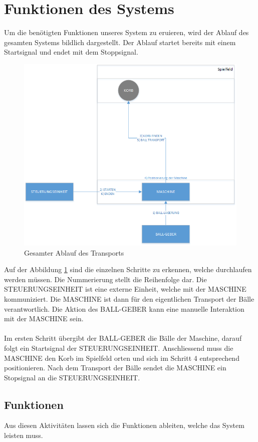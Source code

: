 \section{Funktionen des Systems}
Um die benötigten Funktionen unseres System zu eruieren, wird der Ablauf des gesamten Systems bildlich dargestellt. Der Ablauf startet bereits mit einem Startsignal und endet mit dem Stoppsignal.

\begin{figure}[h!]
\centering
\includegraphics[width=0.7\linewidth]{../../fig/ablauf-transport}
\caption[Gesamter Ablauf des Transports]{Gesamter Ablauf des Transports}
\label{fig:ablauf-transport}
\end{figure}

Auf der Abbildung \ref{fig:ablauf-transport} sind die einzelnen Schritte zu erkennen, welche durchlaufen werden müssen. Die Nummerierung stellt die Reihenfolge dar. Die STEUERUNGSEINHEIT ist eine externe Einheit, welche mit der MASCHINE kommuniziert. Die MASCHINE ist dann für den eigentlichen Transport der Bälle verantwortlich. Die Aktion des BALL-GEBER kann eine manuelle Interaktion mit der MASCHINE sein.\\
\\
Im ersten Schritt übergibt der BALL-GEBER die Bälle der Maschine, darauf folgt ein Startsignal der STEUERUNGSEINHEIT. Anschliessend muss die MASCHINE den Korb im Spielfeld orten und sich im Schritt 4 entsprechend positionieren. Nach dem Transport der Bälle sendet die MASCHINE ein Stopsignal an die STEUERUNGSEINHEIT.

\subsection{Funktionen}
Aus diesen Aktivitäten lassen sich die Funktionen ableiten, welche das System leisten muss.\\
 
